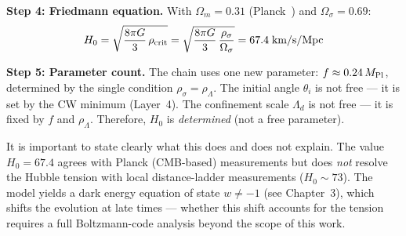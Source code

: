 \textbf{Step 4: Friedmann equation.}
With $\Omega_m = 0.31$ (Planck~\cite{Planck2018}) and $\Omega_\sigma = 0.69$:
\begin{equation}
  H_0 = \sqrt{\frac{8\pi G}{3}\,\rho_{\rm crit}}
  = \sqrt{\frac{8\pi G}{3}\,\frac{\rho_\sigma}{\Omega_\sigma}}
  = 67.4\;\text{km/s/Mpc}
\end{equation}

\textbf{Step 5: Parameter count.}
The chain uses one new parameter: $f \approx 0.24\,M_{\rm Pl}$, determined
by the single condition $\rho_\sigma = \rho_\Lambda$. The initial angle
$\theta_i$ is not free --- it is set by the CW minimum (Layer~4).
The confinement scale $\Lambda_d$ is not free --- it is fixed by $f$ and
$\rho_\Lambda$. Therefore, $H_0$ is \emph{determined} (not a free parameter).

\medskip\noindent
It is important to state clearly what this does and does not explain.
The value $H_0 = 67.4$ agrees with Planck (CMB-based) measurements
but does \emph{not} resolve the Hubble tension with local distance-ladder
measurements ($H_0 \sim 73$). The model yields a dark energy equation
of state $w \neq -1$ (see Chapter~3), which shifts the evolution at late
times --- whether this shift accounts for the tension requires a full
Boltzmann-code analysis beyond the scope of this work.
